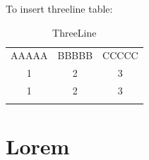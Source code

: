 \documentclass[12pt, a4paper, oneside]{article}
\begin{document}
    To insert threeline table:
    \begin{table}[htbp]
        \centering
        \begin{tabular}{ccc}
        \Xhline{1.5 pt}
        AAAAA & BBBBB & CCCCC \\
        \Xhline{0.5 pt}
        1 & 2 & 3 \\
        1 & 2 & 3 \\
        \Xhline{1.5 pt}
        \end{tabular}
        \caption{ThreeLine}
    \end{table}
    
\section{Lorem}
    \lipsum[1-3]
\end{document}
